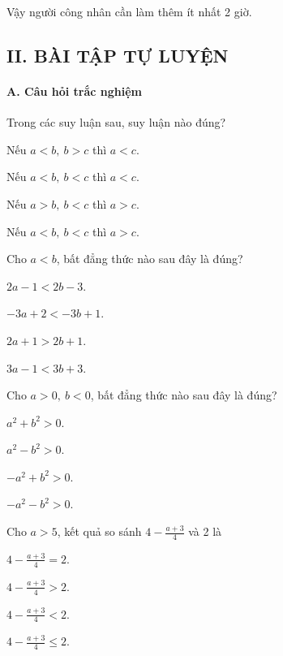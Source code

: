 \documentclass[%
    fontsize=12pt,%
    chapterprefix=false,%
    open=right,%
    twoside=false,%
    numbers=noenddot,%
    headings=optiontohead,%
    final,%
    DIV=15,%
    parskip=half %
]{scrbook}
\begin{document}
Vậy người công nhân cần làm thêm ít nhất 2 giờ.
\subsection{II. BÀI TẬP TỰ LUYỆN}
\paragraph{A. Câu hỏi trắc nghiệm}

\begin{tracnghiem}

\item Trong các suy luận sau, suy luận nào đúng?
\begin{options}
  \item Nếu $a < b,\ b > c$ thì $a < c.$
  \item Nếu $a < b,\ b < c$ thì $a < c.$
  \item Nếu $a > b,\ b < c$ thì $a > c.$
  \item Nếu $a < b,\ b < c$ thì $a > c.$
\end{options}

\item Cho $a < b$, bất đẳng thức nào sau đây là đúng?
\begin{options}
  \item $2a - 1 < 2b - 3.$
  \item $-3a + 2 < -3b + 1.$
  \item $2a + 1 > 2b + 1.$
  \item $3a - 1 < 3b + 3.$
\end{options}

\item Cho $a > 0,\ b < 0$, bất đẳng thức nào sau đây là đúng?
\begin{options}
  \item $a^2 + b^2 > 0.$
  \item $a^2 - b^2 > 0.$
  \item $-a^2 + b^2 > 0.$
  \item $-a^2 - b^2 > 0.$
\end{options}

\item Cho $a > 5$, kết quả so sánh $4 - \frac{a + 3}{4}$ và 2 là
\begin{options}
  \item $4 - \frac{a+3}{4} = 2.$
  \item $4 - \frac{a+3}{4} > 2.$
  \item $4 - \frac{a+3}{4} < 2.$
  \item $4 - \frac{a+3}{4} \leq 2.$
\end{options}


\end{tracnghiem}
\end{document}
